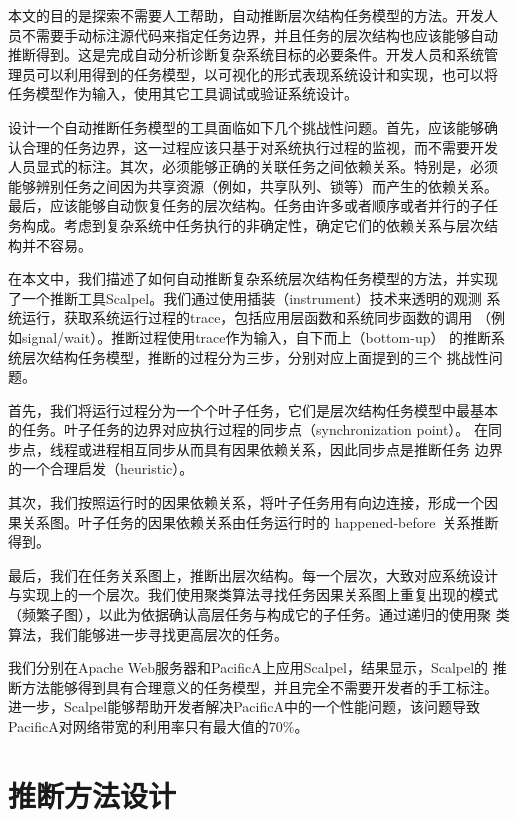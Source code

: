 本文的目的是探索不需要人工帮助，自动推断层次结构任务模型的方法。开发人
员不需要手动标注源代码来指定任务边界，并且任务的层次结构也应该能够自动
推断得到。这是完成自动分析诊断复杂系统目标的必要条件。开发人员和系统管
理员可以利用得到的任务模型，以可视化的形式表现系统设计和实现，也可以将
任务模型作为输入，使用其它工具调试或验证系统设计。

设计一个自动推断任务模型的工具面临如下几个挑战性问题。首先，应该能够确
认合理的任务边界，这一过程应该只基于对系统执行过程的监视，而不需要开发
人员显式的标注。其次，必须能够正确的关联任务之间依赖关系。特别是，必须
能够辨别任务之间因为共享资源（例如，共享队列、锁等）而产生的依赖关系。
最后，应该能够自动恢复任务的层次结构。任务由许多或者顺序或者并行的子任
务构成。考虑到复杂系统中任务执行的非确定性，确定它们的依赖关系与层次结
构并不容易。

在本文中，我们描述了如何自动推断复杂系统层次结构任务模型的方法，并实现
了一个推断工具Scalpel。我们通过使用插装（instrument）技术来透明的观测
系统运行，获取系统运行过程的trace，包括应用层函数和系统同步函数的调用
（例如signal/wait）。推断过程使用trace作为输入，自下而上（bottom-up）
的推断系统层次结构任务模型，推断的过程分为三步，分别对应上面提到的三个
挑战性问题。

首先，我们将运行过程分为一个个叶子任务，它们是层次结构任务模型中最基本
的任务。叶子任务的边界对应执行过程的同步点（synchronization point）。
在同步点，线程或进程相互同步从而具有因果依赖关系，因此同步点是推断任务
边界的一个合理启发（heuristic）。

其次，我们按照运行时的因果依赖关系，将叶子任务用有向边连接，形成一个因
果关系图。叶子任务的因果依赖关系由任务运行时的
happened-before~\cite{lamport_clock}关系推断得到。

最后，我们在任务关系图上，推断出层次结构。每一个层次，大致对应系统设计
与实现上的一个层次。我们使用聚类算法寻找任务因果关系图上重复出现的模式
（频繁子图），以此为依据确认高层任务与构成它的子任务。通过递归的使用聚
类算法，我们能够进一步寻找更高层次的任务。

我们分别在Apache Web服务器和PacificA上应用Scalpel，结果显示，Scalpel的
推断方法能够得到具有合理意义的任务模型，并且完全不需要开发者的手工标注。
进一步，Scalpel能够帮助开发者解决PacificA中的一个性能问题，该问题导致
PacificA对网络带宽的利用率只有最大值的70\%。


\section{推断方法设计}

